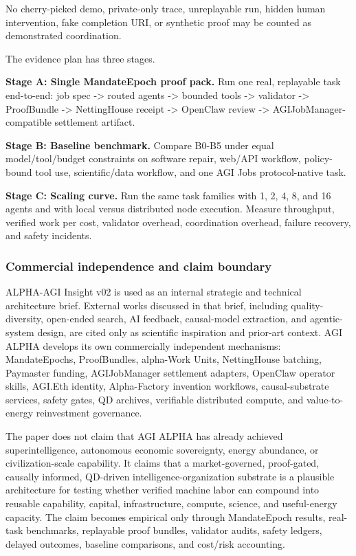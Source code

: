 No cherry-picked demo, private-only trace, unreplayable run, hidden
human intervention, fake completion URI, or synthetic proof may be
counted as demonstrated coordination.

The evidence plan has three stages.

\textbf{Stage A: Single MandateEpoch proof pack.} Run one real,
replayable task end-to-end: job spec -\textgreater{} routed agents
-\textgreater{} bounded tools -\textgreater{} validator -\textgreater{}
ProofBundle -\textgreater{} NettingHouse receipt -\textgreater{}
OpenClaw review -\textgreater{} AGIJobManager-compatible settlement
artifact.

\textbf{Stage B: Baseline benchmark.} Compare B0-B5 under equal
model/tool/budget constraints on software repair, web/API workflow,
policy-bound tool use, scientific/data workflow, and one AGI Jobs
protocol-native task.

\textbf{Stage C: Scaling curve.} Run the same task families with 1, 2,
4, 8, and 16 agents and with local versus distributed node execution.
Measure throughput, verified work per cost, validator overhead,
coordination overhead, failure recovery, and safety incidents.

\subsubsection{Commercial independence and claim
boundary}\label{commercial-independence-and-claim-boundary}

ALPHA-AGI Insight v02 is used as an internal strategic and technical
architecture brief. External works discussed in that brief, including
quality-diversity, open-ended search, AI feedback, causal-model
extraction, and agentic-system design, are cited only as scientific
inspiration and prior-art context. AGI ALPHA develops its own
commercially independent mechanisms: MandateEpochs, ProofBundles,
alpha-Work Units, NettingHouse batching, Paymaster funding,
AGIJobManager settlement adapters, OpenClaw operator skills, AGI.Eth
identity, Alpha-Factory invention workflows, causal-substrate services,
safety gates, QD archives, verifiable distributed compute, and
value-to-energy reinvestment governance.

The paper does not claim that AGI ALPHA has already achieved
superintelligence, autonomous economic sovereignty, energy abundance, or
civilization-scale capability. It claims that a market-governed,
proof-gated, causally informed, QD-driven intelligence-organization
substrate is a plausible architecture for testing whether verified
machine labor can compound into reusable capability, capital,
infrastructure, compute, science, and useful-energy capacity. The claim
becomes empirical only through MandateEpoch results, real-task
benchmarks, replayable proof bundles, validator audits, safety ledgers,
delayed outcomes, baseline comparisons, and cost/risk accounting.

